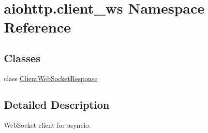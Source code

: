 \hypertarget{namespaceaiohttp_1_1client__ws}{}\section{aiohttp.\+client\+\_\+ws Namespace Reference}
\label{namespaceaiohttp_1_1client__ws}
\subsection*{Classes}
\begin{DoxyCompactItemize}
\item 
class \hyperlink{classaiohttp_1_1client__ws_1_1_client_web_socket_response}{Client\+Web\+Socket\+Response}
\end{DoxyCompactItemize}


\subsection{Detailed Description}
\begin{DoxyVerb}WebSocket client for asyncio.\end{DoxyVerb}
 